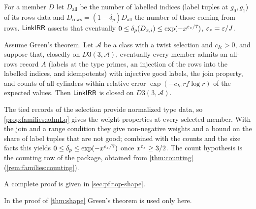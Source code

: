 For a member $D$ let $D_{\mathrm{all}}$ be the number of labelled indices (label tuples at $g_0,g_1$) of its rows
data and $D_{\mathrm{rows}}=(1-\delta_p)D_{\mathrm{all}}$ the number of those coming from rows. $\mathsf{LinkIRR}$
asserts that eventually $0\le\delta_p(D_{x,i})\le\exp(-x^{\varepsilon_z/7})$, $\varepsilon_z=\varepsilon/J$.

\begin{theorem}\Fmark\label{thm:linkIRR}
Assume Green's theorem. Let $\mathcal A$ be a class with a twist selection and $c_{Ic}>0$, and suppose that,
closedly on $D3(3,\mathcal A)$, eventually every member admits an all-rows record $A$ (labels at the type primes,
an injection of the rows into the labelled indices, and idempotents) with injective good labels, the join
property, and counts of all cylinders within relative error $\exp(-c_{Ic}\,rf\log r)$ of the expected values.
Then $\mathsf{LinkIRR}$ is closed on $D3(3,\mathcal A)$.
\end{theorem}

\begin{proofoutline}
The tied records of the selection provide normalized type data, so \cref{prop:families:admLq} gives the
weight properties at every selected member. With the join and a range condition they give non-negative weights
and a bound on the share of label tuples that are not good; combined with the counts and the size facts this
yields $0\le\delta_p\le\exp(-x^{\varepsilon_z/7})$ once $x^{\varepsilon_z}\ge3/2$. The count hypothesis is the counting row of
the package, obtained from \cref{thm:counting} (\cref{rem:families:counting}).

A complete proof is given in \cref{sec:pf:top-shape}.
\end{proofoutline}

In the proof of \cref{thm:shape} Green's theorem is used only here.

